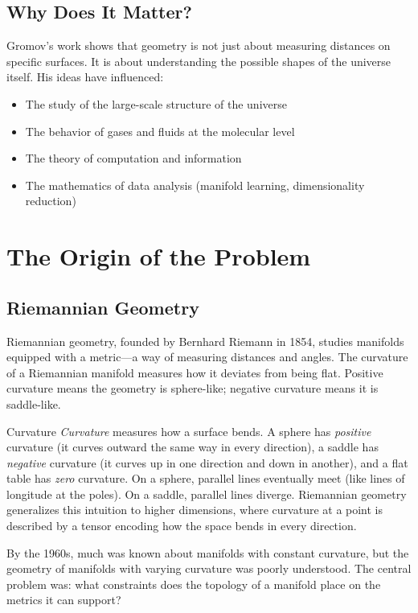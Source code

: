 \subsection{Why Does It Matter?}

Gromov's work shows that geometry is not just about measuring distances on specific surfaces. It is about understanding the possible shapes of the universe itself. His ideas have influenced:
\begin{itemize}
\item The study of the large-scale structure of the universe
\item The behavior of gases and fluids at the molecular level
\item The theory of computation and information
\item The mathematics of data analysis (manifold learning, dimensionality reduction)
\end{itemize}

\section{The Origin of the Problem}

\subsection{Riemannian Geometry}

Riemannian geometry, founded by Bernhard Riemann in 1854, studies manifolds equipped with a metric---a way of measuring distances and angles. The curvature of a Riemannian manifold measures how it deviates from being flat. Positive curvature means the geometry is sphere-like; negative curvature means it is saddle-like.

\begin{knowledgebridge}{Curvature}
\emph{Curvature} measures how a surface bends. A sphere has \emph{positive} curvature (it curves outward the same way in every direction), a saddle has \emph{negative} curvature (it curves up in one direction and down in another), and a flat table has \emph{zero} curvature. On a sphere, parallel lines eventually meet (like lines of longitude at the poles). On a saddle, parallel lines diverge. Riemannian geometry generalizes this intuition to higher dimensions, where curvature at a point is described by a tensor encoding how the space bends in every direction.
\end{knowledgebridge}

By the 1960s, much was known about manifolds with constant curvature, but the geometry of manifolds with varying curvature was poorly understood. The central problem was: what constraints does the topology of a manifold place on the metrics it can support?

